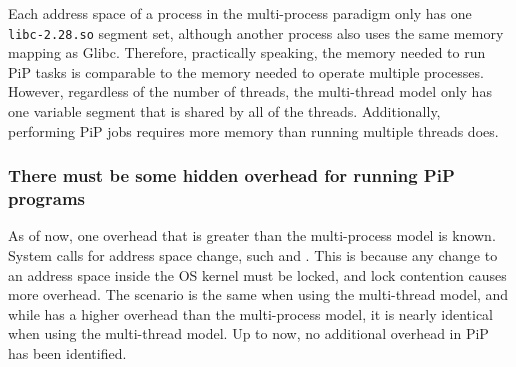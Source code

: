 Each address space of a process in the multi-process paradigm only has
one {\tt libc-2.28.so} segment set, although another process also uses the
same memory mapping as Glibc. Therefore, practically speaking, the
memory needed to run PiP tasks is comparable to the memory needed to
operate multiple processes. However, regardless of the number of
threads, the multi-thread model only has one variable segment that is
shared by all of the threads. Additionally, performing PiP jobs
requires more memory than running multiple threads does.

\subsubsection*{There must be some hidden overhead for running PiP
  programs}

As of now, one overhead that is greater than the multi-process model
is known. System calls for address space change, such
 and . This is because any change
to an address space inside the OS 
kernel must be locked, and lock contention causes more overhead. The
scenario is the same when using the multi-thread model, and while
 has a higher overhead than the multi-process model,
it is nearly identical when using the multi-thread model. Up to now,
no additional overhead in PiP has been identified.
